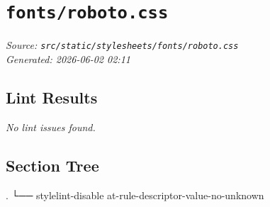 
\section{\texttt{fonts/roboto.css}}
\textit{Source: \texttt{src/static/stylesheets/fonts/roboto.css}} \\
\textit{Generated: 2026-06-02 02:11} \\

\subsection{Lint Results}
\textit{No lint issues found.} \\

\subsection{Section Tree}
\begingroup
\linespread{0.9}\selectfont
\begin{verbnobox}[\FiraCode]
.
└── stylelint-disable at-rule-descriptor-value-no-unknown
\end{verbnobox}
\endgroup

